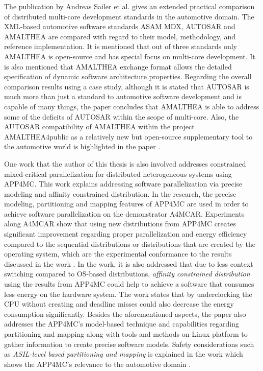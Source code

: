 The publication by Andreas Sailer et al. \cite{comparisonpaperapp4mc} gives an extended practical comparison of distributed multi-core development standards in the automotive domain. The XML-based automotive software standards ASAM MDX, AUTOSAR and AMALTHEA are compared with regard to their model, methodology, and reference implementation. It is mentioned that out of three standards only AMALTHEA is open-source and has special focus on multi-core development. It is also mentioned that AMALTHEA exchange format allows the detailed specification of dynamic software architecture properties. Regarding the overall comparison results using a case study, although it is stated that AUTOSAR is much more than just a standard to automotive software development and is capable of many things, the paper concludes that AMALTHEA is able to address some of the deficits of AUTOSAR within the scope of multi-core. Also, the AUTOSAR compatibility of AMALTHEA within the project AMALTHEA4public as a relatively new but open-source supplementary tool to the automotive world is highlighted in the paper \cite{comparisonpaperapp4mc}.

One work that the author of this thesis is also involved \cite{constrainedpaper} addresses constrained mixed-critical parallelization for distributed heterogeneous systems using APP4MC. This work explains addressing software parallelization via precise modeling and affinity constrained distribution. In the research, the precise modeling, partitioning and mapping features of APP4MC are used in order to achieve software parallelization on the demonstrator A4MCAR. Experiments along A4MCAR show that using new distributions from APP4MC creates significant improvement regarding proper parallelization and energy efficiency compared to the sequential distributions or distributions that are created by the operating system, which are the experimental conformance to the results discussed in the work \cite{priorpaperapp4mc}. In the work, it is also addressed that due to less context switching compared to OS-based distributions, \textit{affinity constrained distribution} using the results from APP4MC could help to achieve a software that consumes less energy on the hardware system. The work states that by underclocking the CPU without creating and deadline misses could also decrease the energy consumption significantly. Besides the aforementioned aspects, the paper \cite{constrainedpaper} also addresses the APP4MC's model-based technique and capabilities regarding partitioning and mapping along with tools and methods on Linux platform to gather information to create precise software models. Safety considerations such as \textit{ASIL-level based partitioning and mapping} is explained in the work which shows the APP4MC's relevance to the automotive domain \cite{constrainedpaper}.

